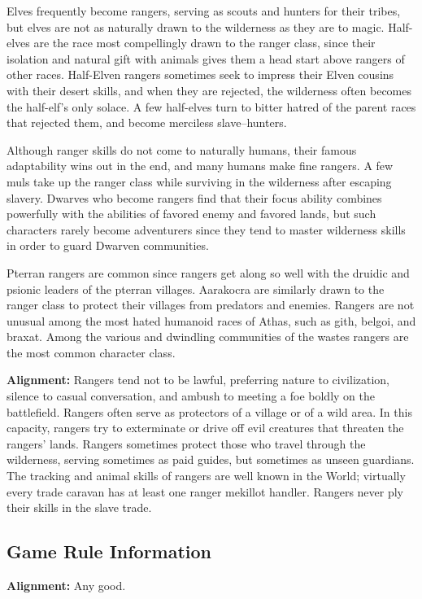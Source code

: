 Elves frequently become rangers, serving as scouts and hunters for their tribes, but elves are not as naturally drawn to the wilderness as they are to magic. Half-elves are the race most compellingly drawn to the ranger class, since their isolation and natural gift with animals gives them a head start above rangers of other races. Half-Elven rangers sometimes seek to impress their Elven cousins with their desert skills, and when they are rejected, the wilderness often becomes the half-elf's only solace. A few half-elves turn to bitter hatred of the parent races that rejected them, and become merciless slave--hunters.

Although ranger skills do not come to naturally humans, their famous adaptability wins out in the end, and many humans make fine rangers. A few muls take up the ranger class while surviving in the wilderness after escaping slavery. Dwarves who become rangers find that their focus ability combines powerfully with the abilities of favored enemy and favored lands, but such characters rarely become adventurers since they tend to master wilderness skills in order to guard Dwarven communities.

Pterran rangers are common since rangers get along so well with the druidic and psionic leaders of the pterran villages. Aarakocra are similarly drawn to the ranger class to protect their villages from predators and enemies. Rangers are not unusual among the most hated humanoid races of Athas, such as gith, belgoi, and braxat. Among the various and dwindling communities of the wastes rangers are the most common character class.

\textbf{Alignment:} Rangers tend not to be lawful, preferring nature to civilization, silence to casual conversation, and ambush to meeting a foe boldly on the battlefield. Rangers often serve as protectors of a village or of a wild area. In this capacity, rangers try to exterminate or drive off evil creatures that threaten the rangers' lands. Rangers sometimes protect those who travel through the wilderness, serving sometimes as paid guides, but sometimes as unseen guardians. The tracking and animal skills of rangers are well known in the World; virtually every trade caravan has at least one ranger mekillot handler. Rangers never ply their skills in the slave trade.

\subsection{Game Rule Information}
\textbf{Alignment:} Any good.

